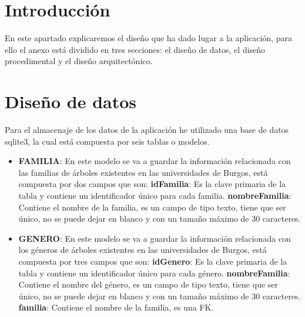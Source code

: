 
\section{Introducción}

En este apartado explicaremos el diseño que ha dado lugar a la aplicación, para ello el anexo está dividido en tres secciones: el diseño de datos, el diseño procedimental y el diseño arquitectónico.

\section{Diseño de datos}

Para el almacenaje de los datos de la aplicación he utilizado una base de datos sqlite3, la cual está compuesta por seis tablas o modelos.


\begin{itemize}
	\item \textbf{FAMILIA}: En este modelo se va a guardar la información relacionada con las familias de árboles existentes en las universidades de Burgos, está compuesta por dos campos que son:
		\subitem \textbf{idFamilia}: Es la clave primaria de la tabla y contiene un identificador único para cada familia.
		\subitem \textbf{nombreFamilia}: Contiene el nombre de la familia, es un campo de tipo texto, tiene que ser único, no se puede dejar en blanco y con un tamaño máximo de 30 caracteres. 
\end{itemize}


\begin{itemize}
	\item \textbf{GENERO}: En este modelo se va a guardar la información relacionada con los géneros de árboles existentes en las universidades de Burgos, está compuesta por tres campos que son:
	\subitem \textbf{idGenero}: Es la clave primaria de la tabla y contiene un identificador único para cada género.
	\subitem \textbf{nombreFamilia}: Contiene el nombre del género, es un campo de tipo texto, tiene que ser único, no se puede dejar en blanco y con un tamaño máximo de 30 caracteres. 
	\subitem \textbf{familia}: Contiene el nombre de la familia, es una FK.
\end{itemize}



